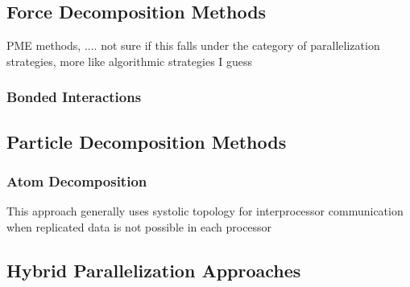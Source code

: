 \documentclass[conference]{IEEEtran}
\begin{document}
    \subsection{Force Decomposition Methods}
    PME methods, .... not sure if this falls under the category of parallelization strategies, more like
    algorithmic strategies I guess

    \subsubsection{Bonded Interactions}
        \subsection{Particle Decomposition Methods}
        \subsubsection{Atom Decomposition}
        This approach generally uses systolic topology for interprocessor communication when replicated data is not 
        possible in each processor

\subsection{Hybrid Parallelization Approaches}
\end{document}
